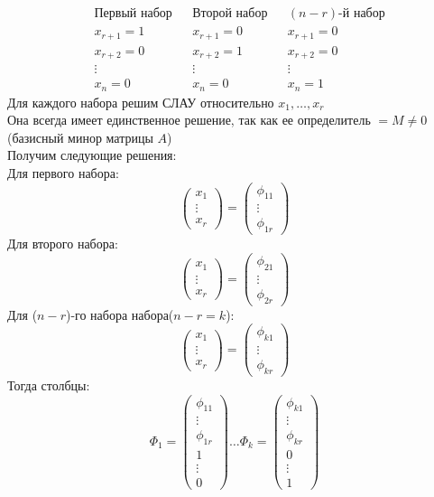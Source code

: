 \documentclass[a4paper,12pt]{article}
\begin{document}
\begin{align*}
&\text{Первый набор}&&\text{Второй набор}&&(n-r)\text{-й набор}\\
&x_{r+1}=1&&x_{r+1}=0&&x_{r+1}=0\\
&x_{r+2}=0&&x_{r+2}=1&&x_{r+2}=0\\
&\vdots&&\vdots&&\vdots\\
&x_{n}=0&&x_{n}=0&&x_{n}=1
\end{align*}
Для каждого набора решим СЛАУ относительно $x_1, \ldots, x_r$\\
Она всегда имеет единственное решение, так как ее определитель $=M\ne0$ (базисный минор матрицы $A$)\\
Получим следующие решения:\\
Для первого набора:
\[
\begin{pmatrix}
x_1\\
\vdots\\
x_r
\end{pmatrix}=\begin{pmatrix}
\phi_{11}\\
\vdots\\
\phi_{1r}
\end{pmatrix}
\]
Для второго набора:
\[
\begin{pmatrix}
x_1\\
\vdots\\
x_r
\end{pmatrix}=\begin{pmatrix}
\phi_{21}\\
\vdots\\
\phi_{2r}
\end{pmatrix}
\]
Для ($n-r$)-го набора набора($n-r=k$):
\[
\begin{pmatrix}
x_1\\
\vdots\\
x_r
\end{pmatrix}=\begin{pmatrix}
\phi_{k1}\\
\vdots\\
\phi_{kr}
\end{pmatrix}
\]
Тогда столбцы:
\[
\Phi_1=\begin{pmatrix}
\phi_{11}\\
\vdots\\
\phi_{1r}\\
1\\
\vdots\\
0
\end{pmatrix}\ldots \Phi_k=\begin{pmatrix}
\phi_{k1}\\
\vdots\\
\phi_{kr}\\
0\\
\vdots\\
1
\end{pmatrix}
\]
\end{document}

